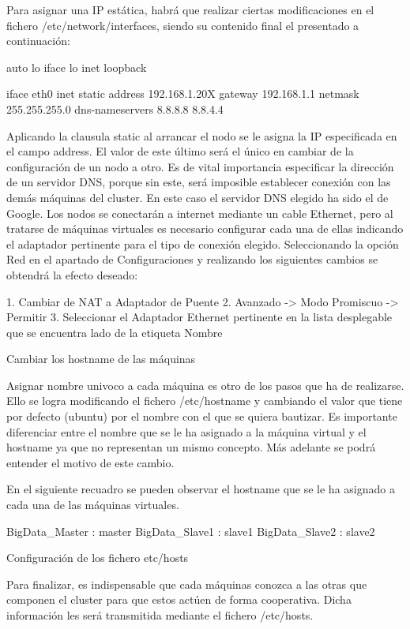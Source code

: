 Para asignar una IP estática, habrá que realizar ciertas modificaciones en el fichero /etc/network/interfaces, siendo su contenido final el presentado a continuación:

auto lo
iface lo inet loopback

iface eth0 inet static
address 192.168.1.20X
gateway 192.168.1.1
netmask 255.255.255.0
dns-nameservers 8.8.8.8 8.8.4.4

Aplicando la clausula static al arrancar el nodo se le asigna la IP especificada en el campo address. El valor de este último será el único en cambiar  de la configuración de un nodo a otro. Es de vital importancia especificar la dirección de un servidor DNS, porque sin este, será imposible establecer conexión con las demás máquinas del cluster. En este caso el servidor DNS elegido ha sido el de Google. 
Los nodos se conectarán a internet mediante un cable Ethernet, pero al tratarse de máquinas virtuales es necesario configurar cada una de ellas indicando el adaptador pertinente para el tipo de conexión elegido. Seleccionando la opción Red en el apartado de Configuraciones y realizando los siguientes cambios se obtendrá la efecto deseado:

1.	Cambiar de NAT a Adaptador de Puente
2.	Avanzado -> Modo Promiscuo -> Permitir
3.	Seleccionar el Adaptador Ethernet pertinente en la lista desplegable que se encuentra lado de la etiqueta Nombre 

Cambiar los hostname de las máquinas

Asignar nombre univoco a cada máquina es otro de los pasos que ha de realizarse. Ello se logra modificando el fichero /etc/hostname y cambiando el valor que tiene por defecto (ubuntu) por el nombre con el que se quiera bautizar. Es importante diferenciar entre el nombre que se le ha asignado a la máquina virtual y el hostname ya que no representan un mismo concepto. Más adelante se podrá entender el motivo de este cambio.

En el siguiente recuadro se pueden observar el hostname que se le ha asignado a cada una de las máquinas virtuales.

BigData_Master : master
BigData_Slave1 : slave1
BigData_Slave2 : slave2

Configuración de los fichero etc/hosts

Para finalizar, es indispensable que cada máquinas conozca a las otras que componen el cluster para que estos actúen de forma  cooperativa. Dicha información les será transmitida mediante el fichero /etc/hosts.

